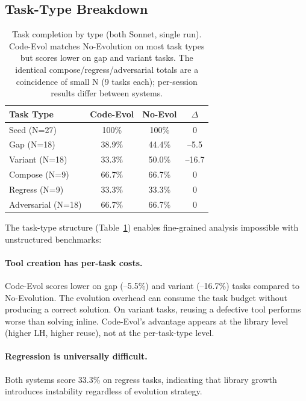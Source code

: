\documentclass[sigconf,anonymous,review,natbib=false]{acmart}
\begin{document}
\subsection{Task-Type Breakdown}

\begin{table}[t]
\centering
\footnotesize
\begin{tabular}{lccc}
\toprule
\textbf{Task Type} & \textbf{Code-Evol} & \textbf{No-Evol} & $\Delta$ \\
\midrule
Seed (N=27) & 100\% & 100\% & 0 \\
Gap (N=18) & 38.9\% & 44.4\% & --5.5 \\
Variant (N=18) & 33.3\% & 50.0\% & --16.7 \\
Compose (N=9) & 66.7\% & 66.7\% & 0 \\
Regress (N=9) & 33.3\% & 33.3\% & 0 \\
Adversarial (N=18) & 66.7\% & 66.7\% & 0 \\
\bottomrule
\end{tabular}
\caption{Task completion by type (both Sonnet, single run). Code-Evol matches No-Evolution on most task types but scores lower on gap and variant tasks. The identical compose/regress/adversarial totals are a coincidence of small N (9 tasks each); per-session results differ between systems.}
\label{tab:task_type}
\end{table}

The task-type structure (Table~\ref{tab:task_type}) enables fine-grained analysis impossible with unstructured benchmarks:

\paragraph{Tool creation has per-task costs.} Code-Evol scores lower on gap (--5.5\%) and variant (--16.7\%) tasks compared to No-Evolution. The evolution overhead can consume the task budget without producing a correct solution. On variant tasks, reusing a defective tool performs worse than solving inline. Code-Evol's advantage appears at the library level (higher LH, higher reuse), not at the per-task-type level.

\paragraph{Regression is universally difficult.} Both systems score 33.3\% on regress tasks, indicating that library growth introduces instability regardless of evolution strategy.
\end{document}
